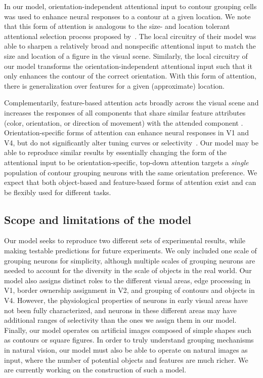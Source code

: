 In our model, orientation-independent attentional input to contour grouping cells was used to enhance neural responses to a contour at
a given location. We note that this form of attention is analogous to the size- and location tolerant attentional selection process proposed by~\cite{Mihalas_etal11b}. The local circuitry of their model was able to sharpen a relatively broad and nonspecific attentional input to match the size and location of a figure in the visual scene. Similarly, the local circuitry of our model transforms the orientation-independent attentional input such that it only enhances the contour of the correct orientation. With this form of attention, there is generalization over features for a given (approximate) location.

Complementarily, feature-based attention acts broadly across the visual scene and increases the responses of all components that share similar feature attributes (\eg color, orientation, or direction of movement) with the attended component \citep{Motter94a,Treue_Trujillo99}. Orientation-specific forms of attention can enhance neural responses in V1 and V4, but do not significantly alter tuning curves or selectivity~\citep{McAdams_Maunsell99a}. Our model may be able to reproduce similar results by essentially changing the form of the attentional input to be orientation-specific, \ie top-down attention targets a \emph{single} population of contour grouping neurons with the same orientation preference. We expect that both object-based and feature-based forms of attention exist and can be flexibly used for different tasks.

\subsection{Scope and limitations of the model}
Our model seeks to reproduce two different sets of experimental results, while making testable predictions for future experiments. We only included one scale of grouping neurons for simplicity, although multiple scales of grouping neurons are needed to account for the diversity in the scale of objects in the real world. Our model also assigns distinct roles to the different visual areas,  edge processing in V1, border ownership assignment in V2, and grouping of contours and objects in V4. However, the physiological properties of neurons in early visual areas have not been fully characterized, and neurons in these different areas may have additional ranges of selectivity than the ones we assign them in our model. Finally, our model operates on artificial images composed of simple shapes such as contours or square
figures. In order to truly understand grouping mechanisms in natural vision, our model must also be able to operate on natural images as input, where the number of potential objects and features are much richer. We are currently working on the construction of such a model.

